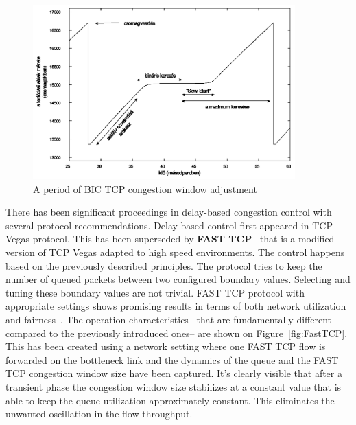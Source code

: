 \documentclass[a4paper]{article}
\begin{document}
\begin{figure}[H]
    \centering
    \includegraphics[width=0.9\textwidth]{figures/BICTCP.png}
    \caption{A period of BIC TCP congestion window adjustment}
    \label{fig:bictcp}
\end{figure}

There has been significant proceedings in delay-based congestion control with several protocol recommendations.
Delay-based control first appeared in TCP Vegas protocol. This has been superseded by \textbf{FAST TCP}~\cite{FastTCP}
that is a modified version of TCP Vegas adapted to high speed environments. The control happens based on the previously
described principles. The protocol tries to keep the number of queued packets between two configured boundary values.
Selecting and tuning these boundary values are not trivial. FAST TCP protocol with appropriate settings shows
promising results in terms of both network utilization and fairness~\cite{TCPFairnessAnalysis}. The operation
characteristics --that are fundamentally different compared to the previously introduced ones-- are shown on
Figure~\ref{fig:FastTCP}. This has been created using a network setting where one FAST TCP flow is forwarded on the
bottleneck link and the dynamics of the queue and the FAST TCP congestion window size have been captured. It's clearly
visible that after a transient phase the congestion window size stabilizes at a constant value that is able to keep
the queue utilization approximately constant. This eliminates the unwanted oscillation in the flow throughput.
\end{document}
